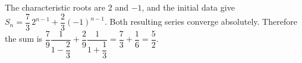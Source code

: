 The characteristic roots are 2 and $-1 $, and the initial data give $ S_n=\dfrac{7}{3}\,2^{n-1}+\dfrac{2}{3}(-1)^{n-1}$. Both resulting series converge absolutely. Therefore the sum is $\dfrac{7}{9}\dfrac{1}{1-\dfrac{2}{3}}+\dfrac{2}{9}\dfrac{1}{1+\dfrac{1}{3}}=\dfrac{7}{3}+\dfrac{1}{6}=\boxed{\dfrac{5}{2}}$.
